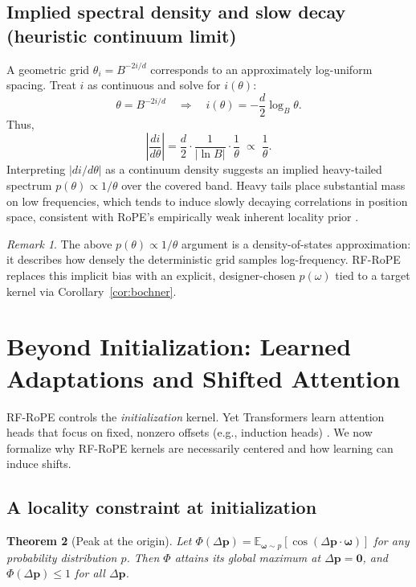 \documentclass{article}
\theoremstyle{plain}
\newtheorem{theorem}{Theorem}[section]
\theoremstyle{remark}
\newtheorem{remark}[theorem]{Remark}
\begin{document}
\subsection{Implied spectral density and slow decay (heuristic continuum limit)}
A geometric grid $\theta_i=B^{-2i/d}$ corresponds to an approximately log-uniform spacing. Treat $i$ as continuous and solve for $i(\theta)$:
\[
\theta = B^{-2i/d}
\quad\Longrightarrow\quad
i(\theta)= -\frac{d}{2}\log_B\theta.
\]
Thus,
\[
\left|\frac{di}{d\theta}\right|
=
\frac{d}{2}\cdot \frac{1}{|\ln B|}\cdot \frac{1}{\theta}
\;\propto\; \frac{1}{\theta}.
\]
Interpreting $\left|di/d\theta\right|$ as a continuum density suggests an implied heavy-tailed spectrum $p(\theta)\propto 1/\theta$ over the covered band. Heavy tails place substantial mass on low frequencies, which tends to induce slowly decaying correlations in position space, consistent with RoPE's empirically weak inherent locality prior \cite{su2021roformer}.

\begin{remark}
The above $p(\theta)\propto 1/\theta$ argument is a density-of-states approximation: it describes how densely the deterministic grid samples log-frequency. RF-RoPE replaces this implicit bias with an explicit, designer-chosen $p(\omega)$ tied to a target kernel via Corollary~\ref{cor:bochner}.
\end{remark}

\section{Beyond Initialization: Learned Adaptations and Shifted Attention}
RF-RoPE controls the \emph{initialization} kernel. Yet Transformers learn attention heads that focus on fixed, nonzero offsets (e.g., induction heads) \cite{olsson2022incontext}. We now formalize why RF-RoPE kernels are necessarily centered and how learning can induce shifts.

\subsection{A locality constraint at initialization}

\begin{theorem}[Peak at the origin]
\label{thm:peak}
Let $\Phi(\Delta\mathbf{p})=\mathbb{E}_{\boldsymbol{\omega}\sim p}[\cos(\Delta\mathbf{p}\cdot\boldsymbol{\omega})]$ for any probability distribution $p$. Then $\Phi$ attains its global maximum at $\Delta\mathbf{p}=\mathbf{0}$, and $\Phi(\Delta\mathbf{p})\le 1$ for all $\Delta\mathbf{p}$.
\end{theorem}
\end{document}
